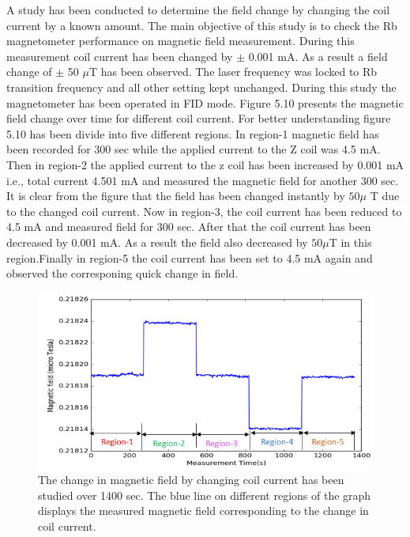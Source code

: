 \begin{itemize}
 A study has been conducted to determine the field change by changing the coil current by a known amount. The main objective of this study is to check the Rb magnetometer performance on magnetic field measurement. During this measurement coil current has been changed by $\pm$ 0.001 mA. As a result a field change of $\pm$ 50  $\mu$T  has been observed. The laser frequency was locked to Rb transition frequency and all other setting kept unchanged. During this study the magnetometer has been operated in FID mode. Figure 5.10 presents the magnetic field change over time for different coil current. For better understanding figure 5.10 has been divide into five different regions. In region-1 magnetic field  has been recorded for 300 sec while the applied current to the Z coil was 4.5 mA. Then in region-2 the applied current to the z coil has been increased by 0.001 mA i.e., total current 4.501 mA and measured the magnetic field for another 300 sec. It is clear from the figure that the field has been changed instantly by $50 \mu$ T due to the changed coil current. Now in region-3, the coil current has been reduced to 4.5 mA and measured field for 300 sec. After that the coil current has been decreased by 0.001 mA. As a result the field also decreased by $50 \mu$T in this region.Finally in region-5 the coil current has been set to 4.5 mA again and observed the corresponing quick change in field.

   \begin{figure}[h]
\centering\includegraphics[width=0.7\linewidth]{figures/field_change_with_current}
\caption{The change in magnetic field  by changing coil current has been studied over 1400 sec. The blue line on different regions of the graph displays the measured magnetic field corresponding to the change in coil current. }
\end{figure}
   \end{itemize}
